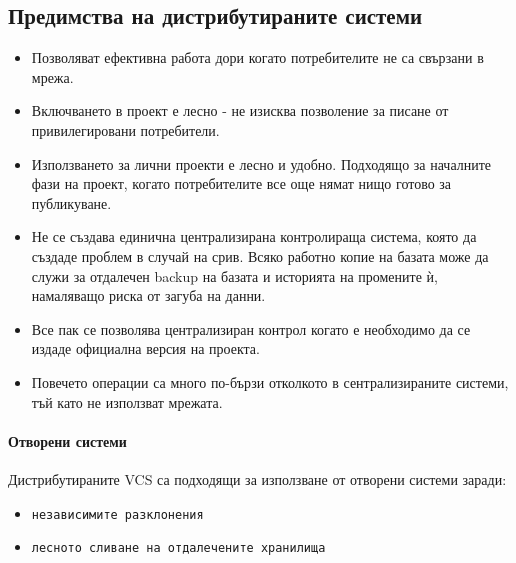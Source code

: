 \documentclass[a4paper]{article}
\begin{document}
  \subsection{Предимства на дистрибутираните системи}
    \begin{itemize}
      \item Позволяват ефективна работа дори когато потребителите не са свързани в мрежа.
      \item Включването в проект е лесно - не изисква позволение за писане от привилегировани потребители.
      \item Използването за лични проекти е лесно и удобно. Подходящо за началните фази на проект, когато потребителите все още нямат нищо готово за публикуване.
      \item Не се създава единична централизирана контролираща система, която да създаде проблем в случай на срив. Всяко работно копие на базата може да служи за отдалечен backup на базата и историята на промените ѝ, намаляващо риска от загуба на данни.
      \item Все пак се позволява централизиран контрол когато е необходимо да се издаде официална версия на проекта.
      \item Повечето операции са много по-бързи отколкото в сентрализираните системи, тъй като не използват мрежата.
    \end{itemize}

    \paragraph{Отворени системи}
      Дистрибутираните VCS са подходящи за използване от отворени системи заради:
      \begin{itemize}
        \item \texttt{независимите разклонения}
        \item \texttt{лесното сливане на отдалечените хранилища}
      \end{itemize}
\end{document}
